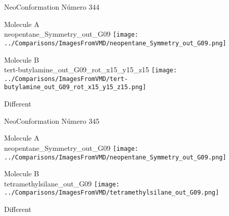  \newpage

\vtab[-3cm]
\begin{center}
{\large NeoConformation \tab Número 344}
\end{center}
\begin{multicols}{2}
\begin{center}
Molecule A \\ 
neopentane\_Symmetry\_out\_G09
\texttt{[image: ../Comparisons/ImagesFromVMD/neopentane\_Symmetry\_out\_G09.png]}
\\
\vtab

\columnbreak
Molecule B \\ 
tert-butylamine\_out\_G09\_rot\_x15\_y15\_z15
\texttt{[image: ../Comparisons/ImagesFromVMD/tert-butylamine\_out\_G09\_rot\_x15\_y15\_z15.png]}
\\
\vtab


\end{center}
\end{multicols}
\begin{center}
\textcolor{NavyBlue}{\Large Different}
\end{center}

 \newpage

\vtab[-3cm]
\begin{center}
{\large NeoConformation \tab Número 345}
\end{center}
\begin{multicols}{2}
\begin{center}
Molecule A \\ 
neopentane\_Symmetry\_out\_G09
\texttt{[image: ../Comparisons/ImagesFromVMD/neopentane\_Symmetry\_out\_G09.png]}
\\
\vtab

\columnbreak
Molecule B \\ 
tetramethylsilane\_out\_G09
\texttt{[image: ../Comparisons/ImagesFromVMD/tetramethylsilane\_out\_G09.png]}
\\
\vtab


\end{center}
\end{multicols}
\begin{center}
\textcolor{NavyBlue}{\Large Different}
\end{center}

 \newpage

